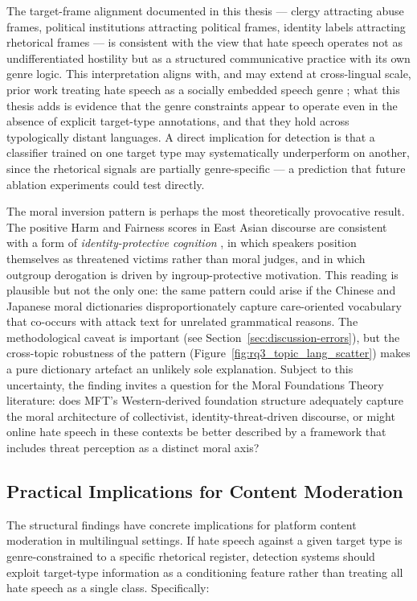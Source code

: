 \documentclass[../CLthesis.tex]{subfiles}
\begin{document}
The target-frame alignment documented in this thesis --- clergy attracting abuse frames, political institutions attracting political frames, identity labels attracting rhetorical frames --- is consistent with the view that hate speech operates not as undifferentiated hostility but as a structured communicative practice with its own genre logic. This interpretation aligns with, and may extend at cross-lingual scale, prior work treating hate speech as a socially embedded speech genre \citep[e.g.,][]{zampieri-etal-2019-predicting}; what this thesis adds is evidence that the genre constraints appear to operate even in the absence of explicit target-type annotations, and that they hold across typologically distant languages. A direct implication for detection is that a classifier trained on one target type may systematically underperform on another, since the rhetorical signals are partially genre-specific --- a prediction that future ablation experiments could test directly.

The moral inversion pattern is perhaps the most theoretically provocative result. The positive Harm and Fairness scores in East Asian discourse are consistent with a form of \emph{identity-protective cognition} \citep{billig1973social}, in which speakers position themselves as threatened victims rather than moral judges, and in which outgroup derogation is driven by ingroup-protective motivation. This reading is plausible but not the only one: the same pattern could arise if the Chinese and Japanese moral dictionaries disproportionately capture care-oriented vocabulary that co-occurs with attack text for unrelated grammatical reasons. The methodological caveat is important (see Section~\ref{sec:discussion-errors}), but the cross-topic robustness of the pattern (Figure~\ref{fig:rq3_topic_lang_scatter}) makes a pure dictionary artefact an unlikely sole explanation. Subject to this uncertainty, the finding invites a question for the Moral Foundations Theory literature: does MFT's Western-derived foundation structure adequately capture the moral architecture of collectivist, identity-threat-driven discourse, or might online hate speech in these contexts be better described by a framework that includes threat perception as a distinct moral axis?

\subsection{Practical Implications for Content Moderation}

The structural findings have concrete implications for platform content moderation in multilingual settings. If hate speech against a given target type is genre-constrained to a specific rhetorical register, detection systems should exploit target-type information as a conditioning feature rather than treating all hate speech as a single class. Specifically:
\end{document}
